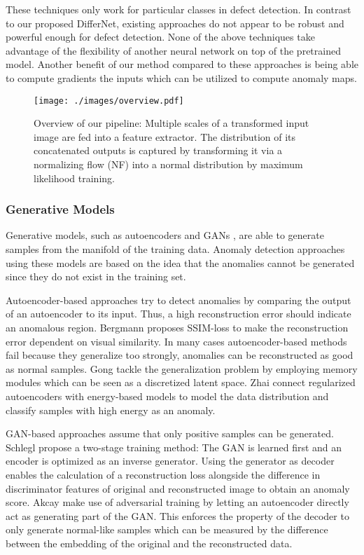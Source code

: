\documentclass[10pt,twocolumn,letterpaper]{article}
\begin{document}
These techniques only work for particular classes in defect detection.
In contrast to our proposed DifferNet, existing approaches do not appear to be robust and powerful enough for defect detection.
None of the above techniques take advantage of the flexibility of another neural network on top of the pretrained model.
Another benefit of our method compared to these approaches is being able to compute gradients \wrt the inputs which can be utilized to compute anomaly maps.

\begin{figure*}[ht!]
\centering
  \texttt{[image: ./images/overview.pdf]} 
 \caption{Overview of our pipeline: Multiple scales of a transformed input image are fed into a feature extractor. The distribution of its concatenated outputs is captured by transforming it via a normalizing flow (NF) into a normal distribution by maximum likelihood training.}
\label{fig:overview}
\end{figure*}

\subsubsection{Generative Models}
Generative models, such as autoencoders \cite{ae_lecun,vae,sae} and GANs \cite{gan}, are able to generate samples from the manifold of the training data.
Anomaly detection approaches using these models are based on the idea that the anomalies cannot be generated since they do not exist in the training set.

Autoencoder-based approaches try to detect anomalies by comparing the output of an autoencoder to its input.
Thus, a high reconstruction error should indicate an anomalous region.
Bergmann \etal \cite{ae_ssim} proposes SSIM-loss to make the reconstruction error dependent on visual similarity.
In many cases autoencoder-based methods fail because they generalize too strongly, \ie anomalies can be reconstructed as good as normal samples.
Gong \etal \cite{memae} tackle the generalization problem by employing memory modules which can be seen as a discretized latent space.
Zhai \etal \cite{dsebm} connect regularized autoencoders with energy-based models to model the data distribution and classify samples with high energy as an anomaly.

GAN-based approaches assume that only positive samples can be generated.
Schlegl \etal \cite{anogan} propose a two-stage training method: The GAN is learned first and an encoder is optimized as an inverse generator.
Using the generator as decoder enables the calculation of a reconstruction loss alongside the difference in discriminator features of original and reconstructed image to obtain an anomaly score.
Akcay \etal \cite{ganomaly} make use of adversarial training by letting an autoencoder directly act as generating part of the GAN.
This enforces the property of the decoder to only generate normal-like samples which can be measured by the difference between the embedding of the original and the reconstructed data.
\end{document}
